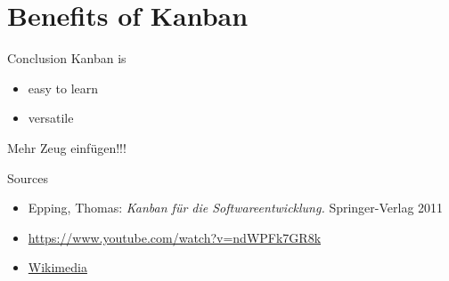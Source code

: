 \documentclass[12pt]{beamer}
\newcommand{\bi}{\begin{itemize}}
\newcommand{\ei}{\end{itemize}}
\begin{document}
	\section{Benefits of Kanban}
	
	
	
		\begin{frame}{Conclusion}
			Kanban is \\
			
			\bi
				\item easy to learn
				\item versatile
			\ei
			
			{\color{orange}Mehr Zeug einfügen!!!}
		\end{frame}
		
		
		\begin{frame}{Sources}
			\bi
				\item Epping, Thomas: \textit{Kanban für die Softwareentwicklung.} Springer-Verlag 2011
				\item \url{https://www.youtube.com/watch?v=ndWPFk7GR8k}
				\item \href{https://upload.wikimedia.org/wikipedia/commons/d/d3/Simple-kanban-board-.jpg}{Wikimedia}
			\ei
		\end{frame}
	
		
	
\end{document}
